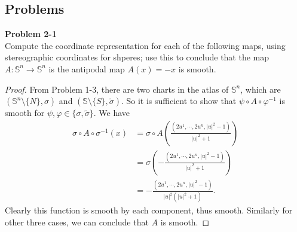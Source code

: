 \documentclass[12pt, a4paper]{article}
\theoremstyle{plain}
\newcommand{\set}[1]{\mathbb{#1}}
\def\phi{\varphi}
\def\tilde{\widetilde}
\newenvironment{problem}[2][Problem]
    { \begin{mdframed}[backgroundcolor=gray!20] \textbf{#1 #2} \\}
    {  \end{mdframed}}
\begin{document}
\subsection{Problems}


    
\begin{problem}{2-1}
    Compute the coordinate representation for each of the following maps, using stereographic coordinates for shperes; use this to conclude that the map $A\colon \set{S}^n\to\set{S}^n$ is the antipodal map $A(x)=-x$ is smooth.
\end{problem}
    \begin{proof}
        From Problem 1-3, there are two charts in the atlas of $\set{S}^n$, which are $(\set{S}^n\setminus\{N\},\sigma)$ and $(\set{S}\setminus\{S\},\tilde\sigma)$. So it is sufficient to show that $\psi\circ A\circ \phi^{-1}$ is smooth for $\psi,\phi\in \{\sigma,\tilde\sigma\}$.
        We have
        \begin{align*}
            \sigma\circ A\circ\sigma^{-1}(x) &= \sigma\circ A \left(\frac{(2u^1,\cdots,2u^n,|u|^2-1)}{|u|^2+1} \right)\\
            &=\sigma\left(-\frac{(2u^1,\cdots,2u^n,|u|^2-1)}{|u|^2+1} \right)\\
            &=-\frac{(2u^1,\cdots,2u^n,|u|^2-1)}{|u|^2(|u|^2+1)}.
        \end{align*}
        Clearly this function is smooth by each component, thus smooth. Similarly for other three cases, we can conclude that $A$ is smooth.
    \end{proof}
\end{document}
